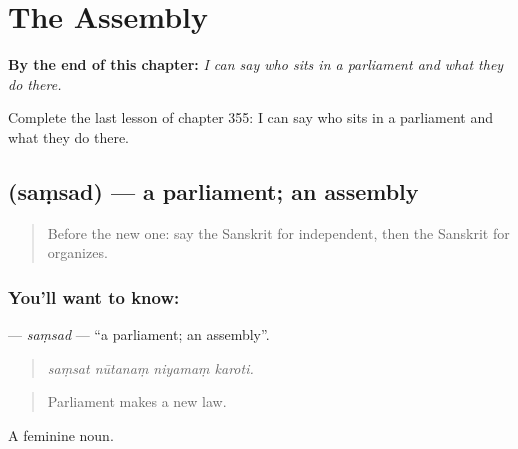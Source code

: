 
\chapter{The Assembly}
\label{ch:sa-the-assembly}

\begin{chapteropening}
\textbf{By the end of this chapter:} \emph{I can say who sits in a parliament and what they do there.}

Complete the last lesson of chapter 355: I can say who sits in a parliament and what they do there.
\end{chapteropening}

\section[\texorpdfstring{\sk{संसद्} (saṃsad)}{संसद् (saṃsad)}]{ (saṃsad) — a parliament; an assembly}

\label{lesson:SA-C355-samsad}



\begin{quote}
Before the new one: say the Sanskrit for independent, then the Sanskrit for organizes.
\end{quote}

\subsection*{You'll want to know: }
\textbf{} — \emph{saṃsad} — \textquotedblleft{}a parliament; an assembly\textquotedblright{}.

\begin{quote}
   
\end{quote}

\begin{quote}
\emph{saṃsat nūtanaṃ niyamaṃ karoti.}
\end{quote}

\begin{quote}
Parliament makes a new law.
\end{quote}

A feminine noun.


